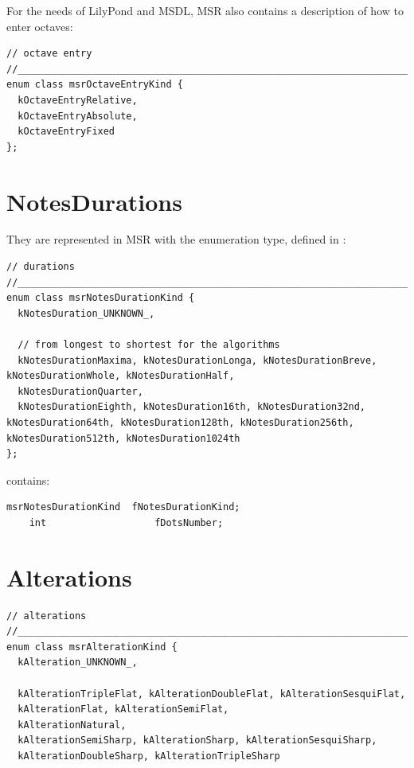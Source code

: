 For the needs of LilyPond and MSDL, MSR also contains a description of how to enter octaves:
\begin{lstlisting}[language=CPlusPlus]
// octave entry
//______________________________________________________________________________
enum class msrOctaveEntryKind {
  kOctaveEntryRelative,
  kOctaveEntryAbsolute,
  kOctaveEntryFixed
};
\end{lstlisting}


\section{NotesDurations}\label{NotesDurations}

They are represented in MSR with the  enumeration type, defined in :
\begin{lstlisting}[language=CPlusPlus]
// durations
//______________________________________________________________________________
enum class msrNotesDurationKind {
  kNotesDuration_UNKNOWN_,

  // from longest to shortest for the algorithms
  kNotesDurationMaxima, kNotesDurationLonga, kNotesDurationBreve, kNotesDurationWhole, kNotesDurationHalf,
  kNotesDurationQuarter,
  kNotesDurationEighth, kNotesDuration16th, kNotesDuration32nd, kNotesDuration64th, kNotesDuration128th, kNotesDuration256th, kNotesDuration512th, kNotesDuration1024th
};
\end{lstlisting}

 contains:
\begin{lstlisting}[language=CPlusPlus]
    msrNotesDurationKind  fNotesDurationKind;
    int                   fDotsNumber;
\end{lstlisting}


\section{Alterations}\label{Alterations}

\begin{lstlisting}[language=CPlusPlus]
// alterations
//______________________________________________________________________________
enum class msrAlterationKind {
  kAlteration_UNKNOWN_,

  kAlterationTripleFlat, kAlterationDoubleFlat, kAlterationSesquiFlat,
  kAlterationFlat, kAlterationSemiFlat,
  kAlterationNatural,
  kAlterationSemiSharp, kAlterationSharp, kAlterationSesquiSharp,
  kAlterationDoubleSharp, kAlterationTripleSharp
\end{lstlisting}


